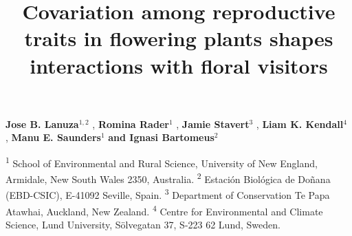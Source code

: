 \documentclass[
  12pt,
  a4paper,
]{article}
\title{\singlespacing \vspace{-1.6cm} \LARGE Covariation among reproductive traits in flowering plants shapes interactions with floral visitors}
\author{}
\date{\vspace{-2.5em}}
\begin{document}
\maketitle

\vspace{-1.4cm}

\singlespacing

\textbf{Jose B. Lanuza$^{1,2}$} , \textbf{Romina Rader$^{1}$} , \textbf{Jamie Stavert$^{3}$} , \textbf{Liam K. Kendall$^{4}$} , \textbf{Manu E. Saunders$^{1}$}  \textbf{and Ignasi Bartomeus$^{2}$} 

\small

\textsuperscript{1} School of Environmental and Rural Science, University of New England, Armidale, New South Wales 2350, Australia. \textsuperscript{2} Estación Biológica de Doñana (EBD-CSIC), E-41092 Seville, Spain. \textsuperscript{3} Department of Conservation \textbar{} Te Papa Atawhai, Auckland, New Zealand. \textsuperscript{4} Centre for Environmental and Climate Science, Lund University, Sölvegatan 37, S-223 62 Lund, Sweden.
\end{document}

